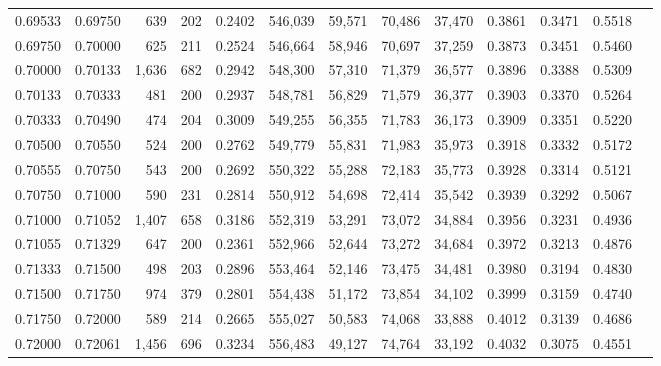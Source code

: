 \begin{tabular}{rrrrrrrrrrrrr}
0.69533 & 0.69750 &   639 & 202 &                                     0.2402 & 546,039 &  59,571 &  70,486 &  37,470 & 0.3861 & 0.3471 & 0.5518 \\
0.69750 & 0.70000 &   625 & 211 &                                     0.2524 & 546,664 &  58,946 &  70,697 &  37,259 & 0.3873 & 0.3451 & 0.5460 \\
0.70000 & 0.70133 & 1,636 & 682 &                                     0.2942 & 548,300 &  57,310 &  71,379 &  36,577 & 0.3896 & 0.3388 & 0.5309 \\
0.70133 & 0.70333 &   481 & 200 &                                     0.2937 & 548,781 &  56,829 &  71,579 &  36,377 & 0.3903 & 0.3370 & 0.5264 \\
0.70333 & 0.70490 &   474 & 204 &                                     0.3009 & 549,255 &  56,355 &  71,783 &  36,173 & 0.3909 & 0.3351 & 0.5220 \\
0.70500 & 0.70550 &   524 & 200 &                                     0.2762 & 549,779 &  55,831 &  71,983 &  35,973 & 0.3918 & 0.3332 & 0.5172 \\
0.70555 & 0.70750 &   543 & 200 &                                     0.2692 & 550,322 &  55,288 &  72,183 &  35,773 & 0.3928 & 0.3314 & 0.5121 \\
0.70750 & 0.71000 &   590 & 231 &                                     0.2814 & 550,912 &  54,698 &  72,414 &  35,542 & 0.3939 & 0.3292 & 0.5067 \\
0.71000 & 0.71052 & 1,407 & 658 &                                     0.3186 & 552,319 &  53,291 &  73,072 &  34,884 & 0.3956 & 0.3231 & 0.4936 \\
0.71055 & 0.71329 &   647 & 200 &                                     0.2361 & 552,966 &  52,644 &  73,272 &  34,684 & 0.3972 & 0.3213 & 0.4876 \\
0.71333 & 0.71500 &   498 & 203 &                                     0.2896 & 553,464 &  52,146 &  73,475 &  34,481 & 0.3980 & 0.3194 & 0.4830 \\
0.71500 & 0.71750 &   974 & 379 &                                     0.2801 & 554,438 &  51,172 &  73,854 &  34,102 & 0.3999 & 0.3159 & 0.4740 \\
0.71750 & 0.72000 &   589 & 214 &                                     0.2665 & 555,027 &  50,583 &  74,068 &  33,888 & 0.4012 & 0.3139 & 0.4686 \\
0.72000 & 0.72061 & 1,456 & 696 &                                     0.3234 & 556,483 &  49,127 &  74,764 &  33,192 & 0.4032 & 0.3075 & 0.4551 \\

\end{tabular}

